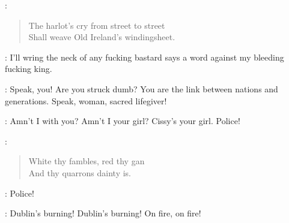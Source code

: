 \Stephen:
\begin{verse}
    The harlot's cry from street to street\\
    Shall weave Old Ireland's windingsheet.
\end{verse}

\Carr:
I'll wring the neck of any fucking bastard
says a word against my bleeding fucking king.

\Bloom:
Speak, you!
Are you struck dumb?
You are the link between nations and generations.
Speak, woman, sacred lifegiver!

\Cissy:
Amn't I with you?
Amn't I your girl?
Cissy's your girl.
Police!

\Stephen:
\begin{verse}
    White thy fambles, red thy gan\\
    And thy quarrons dainty is.
\end{verse}

\Voices:
Police!

\DistantVoices:
Dublin's burning!
Dublin's burning!
On fire, on fire!

